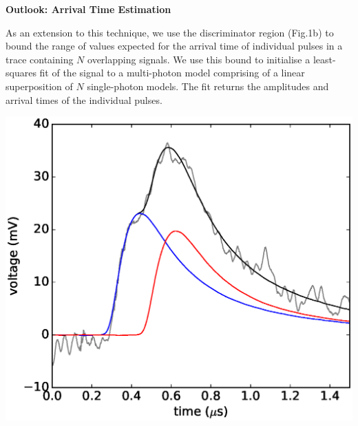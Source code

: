 \begin{center}
  \begin{center} {\bf \Large \textsf {Outlook: Arrival Time Estimation}}\end{center}
\end{center}
As an extension to this technique, we use the discriminator region (Fig.1b) to bound the range of values expected for the arrival time of individual pulses in a trace containing $N$ overlapping signals. 
%
We use this bound to initialise a least-squares fit of the signal to a multi-photon model comprising of a linear superposition of $N$ single-photon models.
%
The fit returns the amplitudes and arrival times of the individual pulses.
%
\begin{figurehere}
  \begin{minipage}{0.7\linewidth}
    \includegraphics[width=1\linewidth]{figures/mcmc_components_170ns/mcmc_fitted_components_170ns.eps}
  \end{minipage}
  \begin{minipage}{0.3\linewidth}

  \end{minipage}
\end{figurehere}